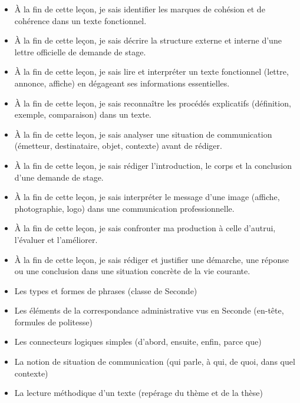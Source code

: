 \documentclass[11pt]{article}
\begin{document}
\begin{objectifs}
\begin{itemize}
\item À la fin de cette leçon, je sais identifier les marques de cohésion et de cohérence dans un texte fonctionnel.
\item À la fin de cette leçon, je sais décrire la structure externe et interne d'une lettre officielle de demande de stage.
\item À la fin de cette leçon, je sais lire et interpréter un texte fonctionnel (lettre, annonce, affiche) en dégageant ses informations essentielles.
\item À la fin de cette leçon, je sais reconnaître les procédés explicatifs (définition, exemple, comparaison) dans un texte.
\item À la fin de cette leçon, je sais analyser une situation de communication (émetteur, destinataire, objet, contexte) avant de rédiger.
\item À la fin de cette leçon, je sais rédiger l'introduction, le corps et la conclusion d'une demande de stage.
\item À la fin de cette leçon, je sais interpréter le message d'une image (affiche, photographie, logo) dans une communication professionnelle.
\item À la fin de cette leçon, je sais confronter ma production à celle d'autrui, l'évaluer et l'améliorer.
\item À la fin de cette leçon, je sais rédiger et justifier une démarche, une réponse ou une conclusion dans une situation concrète de la vie courante.
\end{itemize}
\end{objectifs}

\begin{prerequis}
\begin{itemize}
\item Les types et formes de phrases (classe de Seconde)
\item Les éléments de la correspondance administrative vus en Seconde (en-tête, formules de politesse)
\item Les connecteurs logiques simples (d'abord, ensuite, enfin, parce que)
\item La notion de situation de communication (qui parle, à qui, de quoi, dans quel contexte)
\item La lecture méthodique d'un texte (repérage du thème et de la thèse)
\end{itemize}
\end{prerequis}
\end{document}
